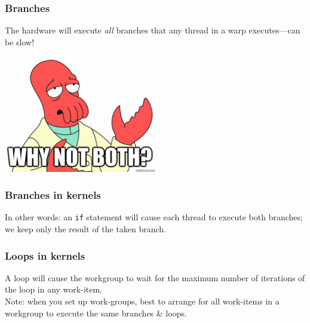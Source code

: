 \begin{frame}
\frametitle{Branches}

The hardware will execute \emph{all} branches that any thread in a warp
      executes---can be slow!\\[1em]


\begin{center}
	\includegraphics[width=0.5\textwidth]{images/whynotboth.jpg}
\end{center}

\end{frame}


\begin{frame}
  \frametitle{Branches in kernels}


    
    In other words: an {\tt if} statement will cause each thread to execute
      both branches; we keep only the result of the taken branch.\\[1em]


\end{frame}

\begin{frame}
  \frametitle{Loops in kernels}


      
    A loop will cause the workgroup to wait for the maximum number of
      iterations of the loop in any work-item.\\[1em]

  Note: when you set up work-groups, best to arrange for all work-items in
  a workgroup to execute the same branches \& loops.

\end{frame}

